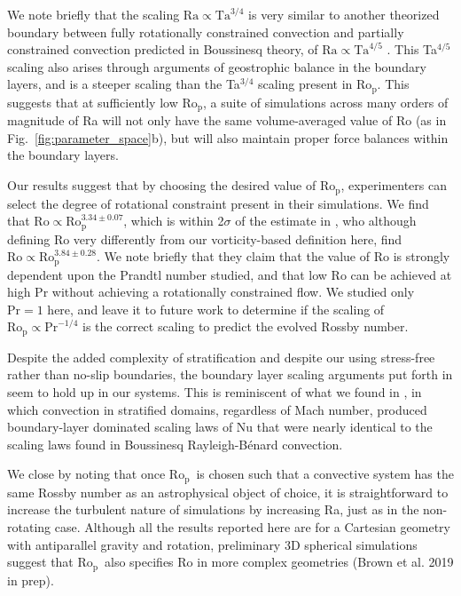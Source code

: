 \documentclass[twocolumn, amsmath, amsfonts, amssymb, trackchanges]{aastex62}
\newcommand{\RB}{Rayleigh-B\'{e}nard }
\newcommand{\pro}{\ensuremath{\text{Ro}_{\text{p}}}}
\begin{document}
We note briefly that the scaling $\text{Ra} \propto \text{Ta}^{3/4}$ is very similar to
another theorized boundary between fully rotationally constrained convection and 
partially constrained convection predicted in Boussinesq theory, of 
$\text{Ra} \propto \text{Ta}^{4/5}$ \citep{julien&all2012, gastine&all2016}. This
Ta$^{4/5}$ scaling also arises through arguments of geostrophic balance in the boundary layers,
and is a steeper scaling than the Ta$^{3/4}$ scaling present in \pro.
This suggests that at sufficiently low \pro, a suite of simulations across many orders
of magnitude of Ra will not only have the same volume-averaged value of Ro 
(as in Fig.~\ref{fig:parameter_space}b), but will
also maintain proper force balances within the boundary layers.

Our results suggest that by choosing the desired value of \pro, experimenters
can select the degree of rotational constraint present in their simulations. 
We find that $\text{Ro} \propto \text{Ro}_\text{p}^{3.34 \pm 0.07}$, which is within
2$\sigma$ of the estimate in \cite{king&all2013}, who although defining
Ro very differently from our vorticity-based definition here, find 
$\text{Ro} \propto \text{Ro}_\text{p}^{3.84 \pm 0.28}$. We note briefly that they
claim that the value of $\text{Ro}$ is strongly dependent upon the Prandtl number studied, and
that low Ro can be achieved at high Pr without achieving a rotationally constrained flow.
We studied only $\text{Pr} = 1$ here, and leave it to future work to determine if
the scaling of $\text{Ro}_{\text{p}} \propto \text{Pr}^{-1/4}$ is the correct scaling to
predict the evolved Rossby number.

Despite the added complexity of stratification and despite our using stress-free rather than
no-slip boundaries, the boundary layer scaling arguments put forth in \cite{king&all2012} seem
to hold up in our systems. This is reminiscent of what we found in \AB, in which
convection in stratified domains, regardless of Mach number, produced boundary-layer
dominated scaling laws of Nu that were nearly identical to the scaling laws found in
Boussinesq \RB convection.

We close by noting that once \pro$\,$ is chosen such that a convective system has the same
Rossby number as an astrophysical object of choice, it is straightforward to increase the 
turbulent nature of 
simulations by increasing Ra, just as in the non-rotating case.
Although all the results reported here are for a Cartesian geometry with 
antiparallel gravity and rotation, preliminary 3D spherical simulations suggest that 
\pro$\,$ also specifies Ro in more complex geometries (Brown et al. 2019 in prep).
\end{document}
